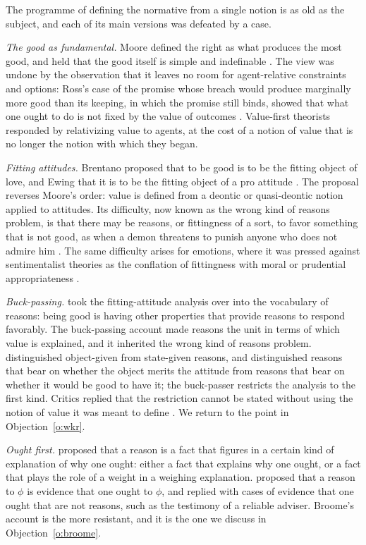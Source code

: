 \documentclass{situationist-preprint}
\begin{document}
The programme of defining the normative from a single notion is as old as the subject, and each of its main versions was defeated by a case.

\emph{The good as fundamental.} Moore defined the right as what produces the most good, and held that the good itself is simple and indefinable \citep{Moore1903}. The view was undone by the observation that it leaves no room for agent-relative constraints and options: Ross's case of the promise whose breach would produce marginally more good than its keeping, in which the promise still binds, showed that what one ought to do is not fixed by the value of outcomes \citep{Ross1930}. Value-first theorists responded by relativizing value to agents, at the cost of a notion of value that is no longer the notion with which they began.

\emph{Fitting attitudes.} Brentano proposed that to be good is to be the fitting object of love, and Ewing that it is to be the fitting object of a pro attitude \citep{Brentano1889,Ewing1939}. The proposal reverses Moore's order: value is defined from a deontic or quasi-deontic notion applied to attitudes. Its difficulty, now known as the wrong kind of reasons problem, is that there may be reasons, or fittingness of a sort, to favor something that is not good, as when a demon threatens to punish anyone who does not admire him \citep{RabinowiczRonnow2004}. The same difficulty arises for emotions, where it was pressed against sentimentalist theories as the conflation of fittingness with moral or prudential appropriateness \citep{DArmsJacobson2000}.

\emph{Buck-passing.} \citet{Scanlon1998} took the fitting-attitude analysis over into the vocabulary of reasons: being good is having other properties that provide reasons to respond favorably. The buck-passing account made reasons the unit in terms of which value is explained, and it inherited the wrong kind of reasons problem. \citet{Parfit2001} distinguished object-given from state-given reasons, and \citet{Hieronymi2005} distinguished reasons that bear on whether the object merits the attitude from reasons that bear on whether it would be good to have it; the buck-passer restricts the analysis to the first kind. Critics replied that the restriction cannot be stated without using the notion of value it was meant to define \citep{Vayrynen2006}. We return to the point in Objection~\ref{o:wkr}.

\emph{Ought first.} \citet{Broome2004} proposed that a reason is a fact that figures in a certain kind of explanation of why one ought: either a fact that explains why one ought, or a fact that plays the role of a weight in a weighing explanation. \citet{KearnsStar2009} proposed that a reason to $\phi$ is evidence that one ought to $\phi$, and \citet{Brunero2009} replied with cases of evidence that one ought that are not reasons, such as the testimony of a reliable adviser. Broome's account is the more resistant, and it is the one we discuss in Objection~\ref{o:broome}.
\end{document}
